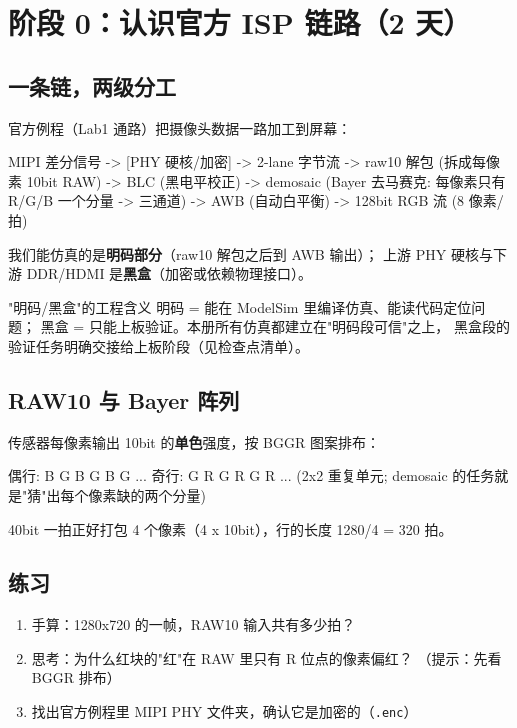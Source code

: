 \documentclass[11pt]{ctexart}
\newcommand{\code}[1]{\texttt{#1}}
\begin{document}
\section{阶段 0：认识官方 ISP 链路（2 天）}

\subsection{一条链，两级分工}

官方例程（Lab1 通路）把摄像头数据一路加工到屏幕：

\begin{Verilog}
MIPI 差分信号 -> [PHY 硬核/加密] -> 2-lane 字节流
   -> raw10 解包 (拆成每像素 10bit RAW)
   -> BLC (黑电平校正)
   -> demosaic (Bayer 去马赛克: 每像素只有 R/G/B 一个分量 -> 三通道)
   -> AWB (自动白平衡)
   -> 128bit RGB 流 (8 像素/拍)
\end{Verilog}

我们能仿真的是\textbf{明码部分}（raw10 解包之后到 AWB 输出）；
上游 PHY 硬核与下游 DDR/HDMI 是\textbf{黑盒}（加密或依赖物理接口）。

\begin{keybox}{"明码/黑盒"的工程含义}
明码 = 能在 ModelSim 里编译仿真、能读代码定位问题；
黑盒 = 只能上板验证。本册所有仿真都建立在"明码段可信"之上，
黑盒段的验证任务明确交接给上板阶段（见检查点清单）。
\end{keybox}

\subsection{RAW10 与 Bayer 阵列}

传感器每像素输出 10bit 的\textbf{单色}强度，按 BGGR 图案排布：

\begin{Verilog}
偶行:  B G B G B G ...
奇行:  G R G R G R ...
(2x2 重复单元; demosaic 的任务就是"猜"出每个像素缺的两个分量)
\end{Verilog}

40bit 一拍正好打包 4 个像素（4 x 10bit），行的长度 1280/4 = 320 拍。

\subsection{练习}

\begin{enumerate}
  \item 手算：1280x720 的一帧，RAW10 输入共有多少拍？
  \item 思考：为什么红块的"红"在 RAW 里只有 R 位点的像素偏红？
    （提示：先看 BGGR 排布）
  \item 找出官方例程里 MIPI PHY 文件夹，确认它是加密的（\code{.enc}）
\end{enumerate}
\end{document}
